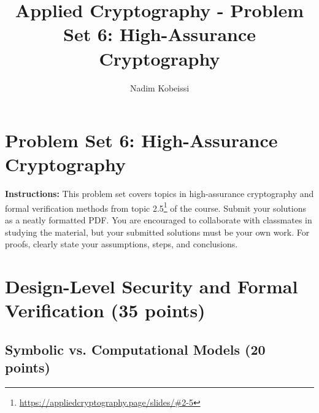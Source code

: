\documentclass[10pt,a4paper,american]{exam}
\title{Applied Cryptography - Problem Set 6: High-Assurance Cryptography}
\author{Nadim Kobeissi}
\begin{document}
\classhandoutheader
\section*{Problem Set 6: High-Assurance Cryptography}

\begin{tcolorbox}[colframe=OliveGreen!30!white,colback=OliveGreen!5!white]
	\textbf{Instructions:} This problem set covers topics in high-assurance cryptography and formal verification methods from topic 2.5\footnote{\url{https://appliedcryptography.page/slides/\#2-5}} of the course. Submit your solutions as a neatly formatted PDF. You are encouraged to collaborate with classmates in studying the material, but your submitted solutions must be your own work. For proofs, clearly state your assumptions, steps, and conclusions.
\end{tcolorbox}

\section{Design-Level Security and Formal Verification (35 points)}

\subsection{Symbolic vs. Computational Models (20 points)}
\end{document}
